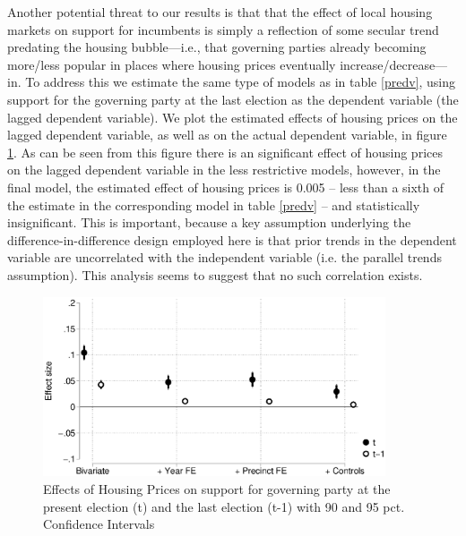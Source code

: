 \documentclass[12pt,a4paper]{article}
\begin{document}
	
	Another potential threat to our results is that that the effect of local housing markets on support for incumbents is simply a reflection of some secular trend predating the housing bubble—i.e., that governing parties already becoming more/less popular in places where housing prices eventually increase/decrease—in. To address this we estimate the same type of models as in table \ref{predv}, using support for the governing party at the last election as the dependent variable (the lagged dependent variable). We plot the estimated effects of housing prices on the lagged dependent variable, as well as on the actual dependent variable, in figure \ref{placebo}. As can be seen from this figure there is an significant effect of housing prices on the lagged dependent variable in the less restrictive models, however, in the final model, the estimated effect of housing prices is 0.005 -- less than a sixth of the estimate in the corresponding model in table \ref{predv} -- and statistically insignificant. This is important, because a key assumption underlying the difference-in-difference design employed here is that prior trends in the dependent variable are uncorrelated with the independent variable (i.e. the parallel trends assumption). This analysis seems to suggest that no such correlation exists.
	
	\begin{figure}[htbp!]
		\includegraphics[width=0.9\textwidth]{../figures/lagdv.eps}
		\centering
		\caption{Effects of Housing Prices on support for governing party at the present election (t) and the last election (t-1) with 90  and 95 pct. Confidence Intervals}\label{placebo}
	\end{figure}
	
\end{document}
